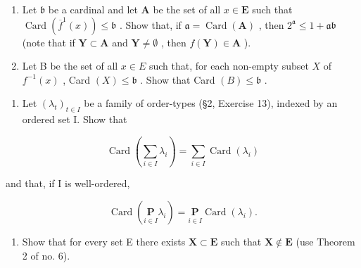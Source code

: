\begin{enumerate}
\def\labelenumi{(\alph{enumi})}
\item
  Let \(\mathfrak{b}\) be a cardinal and let \(\mathbf{A}\) be the set of all \(x \in \mathbf{E}\) such that \(\operatorname{Card}(\overline{f}^1(x)) \leqslant \mathfrak{b}\) . Show that, if \(\mathfrak{a} = \operatorname{Card}(\mathbf{A})\) , then \(2^{\mathfrak{a}} \leqslant 1 + \mathfrak{a}\mathfrak{b}\) (note that if \(\mathbf{Y} \subset \mathbf{A}\) and \(\mathbf{Y} \neq \emptyset\) , then \(f(\mathbf{Y}) \in \mathbf{A}\) ).
\item
  Let B be the set of all \(x \in E\) such that, for each non-empty subset \(X\) of \(f^{-1}(x)\) , Card \((X) \leqslant \mathfrak{b}\) . Show that Card \((B) \leqslant \mathfrak{b}\) .
\end{enumerate}

\begin{enumerate}
\def\labelenumi{\arabic{enumi}.}
\setcounter{enumi}{4}
\tightlist
\item
  Let \((\lambda_{t})_{t\in I}\) be a family of order-types (§2, Exercise 13), indexed by an ordered set I. Show that
\end{enumerate}

\[
\operatorname{Card} \left(\sum_ {i \in I} \lambda_ {i}\right) = \sum_ {i \in I} \operatorname{Card} \left(\lambda_ {i}\right)
\]

and that, if I is well-ordered,

\[
\operatorname{Card} \left(\underset {i \in I} {\mathbf {P}} \lambda_ {i}\right) = \underset {i \in I} {\mathbf {P}} \operatorname{Card} \left(\lambda_ {i}\right).
\]

\begin{enumerate}
\def\labelenumi{\arabic{enumi}.}
\setcounter{enumi}{5}
\tightlist
\item
  Show that for every set E there exists \(\mathbf{X} \subset \mathbf{E}\) such that \(\mathbf{X} \notin \mathbf{E}\) (use Theorem 2 of no. 6).
\end{enumerate}

